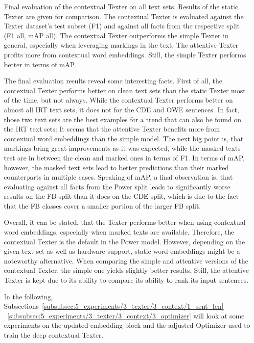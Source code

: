\begin{table}
    \centering
    
    \caption{Final evaluation of the contextual Texter on all text sets. Results of the static Texter are given for comparison. The contextual Texter is evaluated against the Texter dataset's test subset (F1) and against all facts from the respective split (F1 all, mAP all). The contextual Texter outperforms the simple Texter in general, especially when leveraging markings in the text. The attentive Texter profits more from contextual word embeddings. Still, the simple Texter performs better in terms of mAP.}
    \label{tab:5_experiments/3_texter/3_context/results}
\end{table}

The final evaluation results reveal some interesting facts. First of all, the contextual Texter performs better on clean text sets than the static Texter most of the time, but not always. While the contextual Texter performs better on almost all IRT text sets, it does not for the CDE and OWE sentences. In fact, those two text sets are the best examples for a trend that can also be found on the IRT text sets: It seems that the attentive Texter benefits more from contextual word embeddings than the simple model. The next big point is, that markings bring great improvements as it was expected, while the masked texts test are in between the clean and marked ones in terms of F1. In terms of mAP, however, the masked text sets lead to better predictions than their marked counterparts in multiple cases. Speaking of mAP, a final observation is, that evaluating against all facts from the Power split leads to significantly worse results on the FB split than it does on the CDE split, which is due to the fact that the FB classes cover a smaller portion of the larger FB split.

Overall, it can be stated, that the Texter performs better when using contextual word embeddings, especially when marked texts are available. Therefore, the contextual Texter is the default in the Power model. However, depending on the given text set as well as hardware support, static word embeddings might be a noteworthy alternative. When comparing the simple and attentive versions of the contextual Texter, the simple one yields slightly better results. Still, the attentive Texter is kept due to its ability to compare its ability to rank its input sentences.

In the following, Subsections~\ref{subsubsec:5_experiments/3_texter/3_context/1_sent_len}~--~\ref{subsubsec:5_experiments/3_texter/3_context/3_optimizer} will look at some experiments on the updated embedding block and the adjusted Optimizer used to train the deep contextual Texter.

